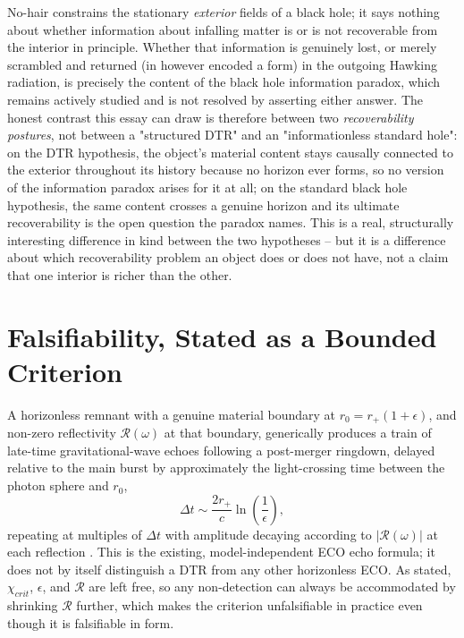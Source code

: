 \documentclass[11pt]{article}
\begin{document}
No-hair constrains the stationary \emph{exterior} fields of a black hole; it says nothing about whether information about infalling matter is or is not recoverable from the interior in principle. Whether that information is genuinely lost, or merely scrambled and returned (in however encoded a form) in the outgoing Hawking radiation, is precisely the content of the black hole information paradox, which remains actively studied and is not resolved by asserting either answer. The honest contrast this essay can draw is therefore between two \emph{recoverability postures}, not between a "structured DTR" and an "informationless standard hole": on the DTR hypothesis, the object's material content stays causally connected to the exterior throughout its history because no horizon ever forms, so no version of the information paradox arises for it at all; on the standard black hole hypothesis, the same content crosses a genuine horizon and its ultimate recoverability is the open question the paradox names. This is a real, structurally interesting difference in kind between the two hypotheses -- but it is a difference about which recoverability problem an object does or does not have, not a claim that one interior is richer than the other.

\section{Falsifiability, Stated as a Bounded Criterion}

A horizonless remnant with a genuine material boundary at $r_0=r_+(1+\epsilon)$, and non-zero reflectivity $\mathcal{R}(\omega)$ at that boundary, generically produces a train of late-time gravitational-wave echoes following a post-merger ringdown, delayed relative to the main burst by approximately the light-crossing time between the photon sphere and $r_0$,
\begin{equation}
\Delta t \sim \frac{2 r_+}{c}\ln\!\left(\frac{1}{\epsilon}\right),
\end{equation}
repeating at multiples of $\Delta t$ with amplitude decaying according to $|\mathcal{R}(\omega)|$ at each reflection \cite{cardosopani2016,cardosopani2017}. This is the existing, model-independent ECO echo formula; it does not by itself distinguish a DTR from any other horizonless ECO. As stated, $\chi_{crit}$, $\epsilon$, and $\mathcal{R}$ are left free, so any non-detection can always be accommodated by shrinking $\mathcal{R}$ further, which makes the criterion unfalsifiable in practice even though it is falsifiable in form.
\end{document}
